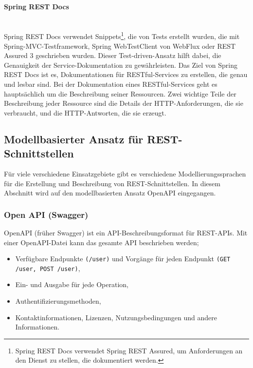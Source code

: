 \paragraph{Spring REST Docs}\mbox{}\\

Spring REST Docs verwendet Snippets\footnote{Spring REST Docs verwendet Spring REST Assured, um Anforderungen an den Dienst zu stellen, die dokumentiert werden.}, die von Tests erstellt wurden, die mit Spring-MVC-Testframework, Spring WebTestClient von WebFlux oder REST Assured 3 geschrieben wurden. Dieser Test-driven-Ansatz hilft dabei, die Genauigkeit der Service-Dokumentation zu gewährleisten. Das Ziel von Spring REST Docs ist es, Dokumentationen für RESTful-Services zu erstellen, die genau und lesbar sind. Bei der Dokumentation eines RESTful-Services geht es hauptsächlich um die Beschreibung seiner Ressourcen. Zwei wichtige Teile der Beschreibung jeder Ressource sind die Details der HTTP-Anforderungen, die sie verbraucht, und die HTTP-Antworten, die sie erzeugt\cite{srd18wilkinson}.

\subsection{Modellbasierter Ansatz für REST-Schnittstellen}

Für viele verschiedene Einsatzgebiete gibt es verschiedene Modellierungssprachen für die Erstellung und Beschreibung von REST-Schnittstellen. In diesem Abschnitt wird auf den modellbasierten Ansatz OpenAPI eingegangen.

\subsubsection{Open API (Swagger)}

OpenAPI (früher Swagger) ist ein API-Beschreibungsformat für REST-APIs. Mit einer OpenAPI-Datei kann das gesamte API beschrieben werden\cite{openapi13def};

\begin{itemize}
	
	\item Verfügbare Endpunkte \texttt{(/user)} und Vorgänge für jeden Endpunkt \texttt{(GET /user, POST /user)},
	
	\item Ein- und Ausgabe für jede Operation,
	
	\item Authentifizierungsmethoden,
	
	\item Kontaktinformationen, Lizenzen, Nutzungsbedingungen und andere Informationen.
	
\end{itemize}

